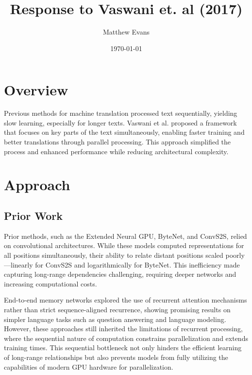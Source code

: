 \documentclass[10pt]{article}
\title{
    Response to Vaswani et. al (2017) \\
}
\author{Matthew Evans}
\date{\today}
\begin{document}
\maketitle

\section*{Overview}
Previous methods\cite{cho2014} for machine translation processed text sequentially, yielding slow learning, especially for longer texts. Vaswani et al.\cite{DBLP:journals/corr/VaswaniSPUJGKP17} proposed a framework that focuses on key parts of the text simultaneously, enabling faster training and better translations through parallel processing. This approach simplified the process and enhanced performance while reducing architectural complexity.

\section*{Approach}
\subsection*{Prior Work}
Prior methods, such as the Extended Neural GPU\cite{NIPS2016_fb8feff2}, ByteNet\cite{DBLP:journals/corr/KalchbrennerESO16}, and ConvS2S\cite{DBLP:journals/corr/GehringAGYD17}, relied on convolutional architectures. While these models computed representations for all positions simultaneously, their ability to relate distant positions scaled poorly—linearly for ConvS2S and logarithmically for ByteNet. This inefficiency made capturing long-range dependencies challenging, requiring deeper networks and increasing computational costs.

End-to-end memory networks\cite{NIPS2015_8fb21ee7} explored the use of recurrent attention mechanisms rather than strict sequence-aligned recurrence, showing promising results on simpler language tasks such as question answering and language modeling. However, these approaches still inherited the limitations of recurrent processing, where the sequential nature of computation constrains parallelization and extends training times. This sequential bottleneck not only hinders the efficient learning of long-range relationships but also prevents models from fully utilizing the capabilities of modern GPU hardware for parallelization.
\end{document}
